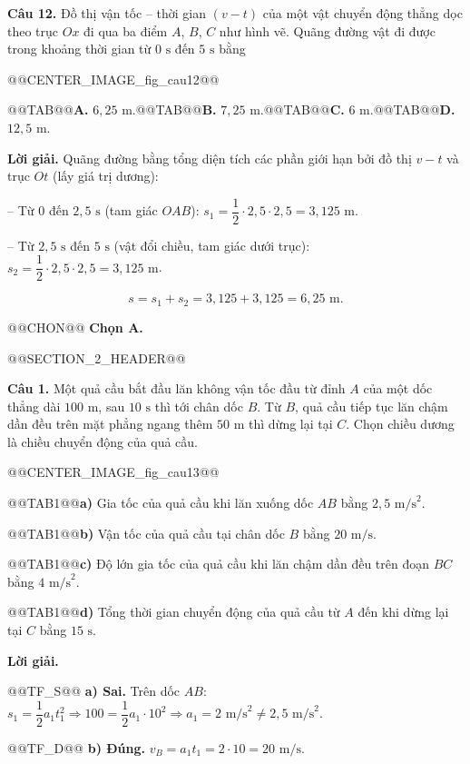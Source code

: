 \documentclass{article}
\begin{document}
\textbf{Câu 12.} Đồ thị vận tốc -- thời gian $(v - t)$ của một vật chuyển động thẳng dọc theo trục $Ox$ đi qua ba điểm $A$, $B$, $C$ như hình vẽ. Quãng đường vật đi được trong khoảng thời gian từ $0\text{ s}$ đến $5\text{ s}$ bằng

@@CENTER_IMAGE_fig_cau12@@

@@TAB@@\textbf{A.} $6{,}25\text{ m}$.@@TAB@@\textbf{B.} $7{,}25\text{ m}$.@@TAB@@\textbf{C.} $6\text{ m}$.@@TAB@@\textbf{D.} $12{,}5\text{ m}$.

\textbf{Lời giải.} Quãng đường bằng tổng diện tích các phần giới hạn bởi đồ thị $v - t$ và trục $Ot$ (lấy giá trị dương):

-- Từ $0$ đến $2{,}5\text{ s}$ (tam giác $OAB$): $s_1 = \dfrac{1}{2} \cdot 2{,}5 \cdot 2{,}5 = 3{,}125\text{ m}$.

-- Từ $2{,}5\text{ s}$ đến $5\text{ s}$ (vật đổi chiều, tam giác dưới trục): $s_2 = \dfrac{1}{2} \cdot 2{,}5 \cdot 2{,}5 = 3{,}125\text{ m}$.

\[s = s_1 + s_2 = 3{,}125 + 3{,}125 = 6{,}25\text{ m}.\]

@@CHON@@ \textbf{Chọn A.}

@@SECTION_2_HEADER@@

\textbf{Câu 1.} Một quả cầu bắt đầu lăn không vận tốc đầu từ đỉnh $A$ của một dốc thẳng dài $100\text{ m}$, sau $10\text{ s}$ thì tới chân dốc $B$. Từ $B$, quả cầu tiếp tục lăn chậm dần đều trên mặt phẳng ngang thêm $50\text{ m}$ thì dừng lại tại $C$. Chọn chiều dương là chiều chuyển động của quả cầu.

@@CENTER_IMAGE_fig_cau13@@

@@TAB1@@\textbf{a)} Gia tốc của quả cầu khi lăn xuống dốc $AB$ bằng $2{,}5\text{ m/s}^2$.

@@TAB1@@\textbf{b)} Vận tốc của quả cầu tại chân dốc $B$ bằng $20\text{ m/s}$.

@@TAB1@@\textbf{c)} Độ lớn gia tốc của quả cầu khi lăn chậm dần đều trên đoạn $BC$ bằng $4\text{ m/s}^2$.

@@TAB1@@\textbf{d)} Tổng thời gian chuyển động của quả cầu từ $A$ đến khi dừng lại tại $C$ bằng $15\text{ s}$.

\textbf{Lời giải.}

@@TF_S@@ \textbf{a) Sai.} Trên dốc $AB$: $s_1 = \dfrac{1}{2}a_1t_1^2 \Rightarrow 100 = \dfrac{1}{2}a_1 \cdot 10^2 \Rightarrow a_1 = 2\text{ m/s}^2 \ne 2{,}5\text{ m/s}^2$.

@@TF_D@@ \textbf{b) Đúng.} $v_B = a_1t_1 = 2 \cdot 10 = 20\text{ m/s}$.
\end{document}

